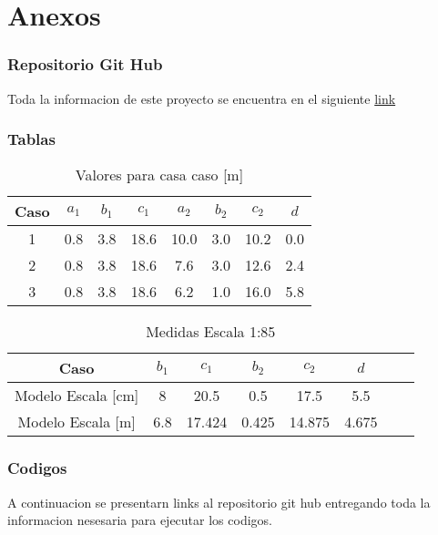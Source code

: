 \part{Anexos}

\section{Repositorio Git Hub}

Toda la informacion de este proyecto se encuentra en el siguiente \href{https://github.com/LukasWolff2002/ENTREGA_3_MCOC}{link}

\section{Tablas}

\begin{table}[H]
    \centering
    \begin{tabular}{|c|c|c|c|c|c|c|c|}
    \hline
    Caso & $a_1$ & $b_1$ & $c_1$ & $a_2$ & $b_2$ & $c_2$ & $d$ \\ \hline
    1    & 0.8   & 3.8   & 18.6  & 10.0  & 3.0   & 10.2  & 0.0 \\ \hline
    2    & 0.8   & 3.8   & 18.6  & 7.6   & 3.0   & 12.6  & 2.4  \\ \hline
    3    & 0.8   & 3.8   & 18.6  & 6.2   & 1.0   & 16.0  & 5.8  \\ \hline
    \end{tabular}
    \caption{Valores para casa caso [m]}
    \label{tab:medidas}
\end{table}

\begin{table}[H]
    \centering
    \begin{tabular}{|c|c|c|c|c|c|c|c|}
    \hline
    Caso  & $b_1$ & $c_1$  & $b_2$ & $c_2$ & $d$ \\ \hline
    Modelo Escala [cm] & 8  & 20.5  & 0.5   & 17.5  & 5.5 \\ \hline
    Modelo Escala [m] & 6.8  & 17.424 & 0.425   & 14.875  & 4.675  \\ \hline
    \end{tabular}
    \caption{Medidas Escala 1:85}
    \label{tab:medidas_escaladas}
\end{table}

\section{Codigos}

A continuacion se presentarn links al repositorio git hub entregando toda la informacion nesesaria para ejecutar los codigos.

